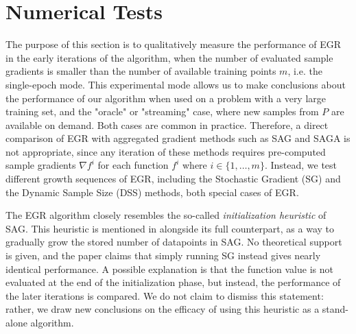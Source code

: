 \documentclass[11pt]{article}
\begin{document}
%   
  
\section{Numerical Tests} \label{numerical}
 
 
 The purpose of this section is to qualitatively measure the performance of EGR in the early iterations of the algorithm, when the number of evaluated sample gradients is smaller than the number of available training points $m$, i.e. the single-epoch mode. This experimental mode allows us to make conclusions about the performance of our algorithm when used on a problem with a very large training set, and the "oracle" or "streaming" case,  where new samples from $P$ are available on demand. Both cases are common in practice. Therefore, a direct comparison of EGR with aggregated gradient methods such as SAG and SAGA is not appropriate, since any iteration of these methods requires pre-computed sample gradients $\nabla f^i$ for each function $f^i$ where $i \in  \{1 , \ldots, m \} $. Instead, we test different growth sequences of EGR, including the Stochastic Gradient (SG) and the Dynamic Sample Size (DSS) methods, both special cases of EGR.

 The EGR algorithm closely resembles the so-called \emph{initialization heuristic} of SAG. This heuristic is mentioned in \cite{NIPS2014_5258} alongside its full counterpart, as a way to gradually grow the stored number of datapoints in SAG. No theoretical support is given, and the paper claims that simply running SG instead gives nearly identical performance. A possible explanation is that the function value is not evaluated at the end of the initialization phase, but instead, the performance of the later iterations is compared. We do not claim to dismiss this statement: rather, we draw new conclusions on the efficacy of using this heuristic as a stand-alone algorithm. 
 
\end{document}
